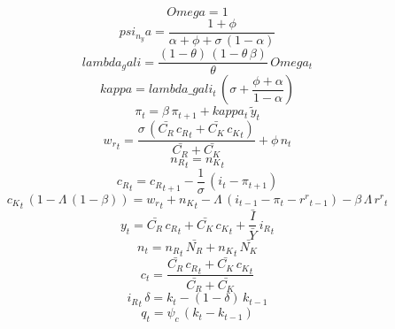 \documentclass[10pt,a4paper]{article}
\begin{document}
\footnotesize
\begin{dmath*}
Omega = 1
\end{dmath*}
\begin{dmath*}
psi_n_ya = \frac{1+{\phi}}{{\alpha}+{\phi}+{\sigma}\, \left(1-{\alpha}\right)}
\end{dmath*}
\begin{dmath*}
lambda_gali = \frac{\left(1-{\theta}\right)\, \left(1-{\theta}\, {\beta}\right)}{{\theta}}\, Omega_{t}
\end{dmath*}
\begin{dmath*}
kappa = lambda\_gali_{t}\, \left({\sigma}+\frac{{\phi}+{\alpha}}{1-{\alpha}}\right)
\end{dmath*}
\begin{dmath}
{\pi}_{t}={\beta}\, {\pi}_{t+1}+kappa_{t}\, {\tilde y}_{t}
\end{dmath}
\begin{dmath}
{w_r}_{t}=\frac{{\sigma}\, \left(\bar{C_R}\, {c_R}_{t}+\bar{C_K}\, {c_K}_{t}\right)}{\bar{C_R}+\bar{C_K}}+{\phi}\, {n}_{t}
\end{dmath}
\begin{dmath}
{n_R}_{t}={n_K}_{t}
\end{dmath}
\begin{dmath}
{c_R}_{t}={c_R}_{t+1}-\frac{1}{{\sigma}}\, \left({i}_{t}-{\pi}_{t+1}\right)
\end{dmath}
\begin{dmath}
{c_K}_{t}\, \left(1-{\Lambda}\, \left(1-{\beta}\right)\right)={w_r}_{t}+{n_K}_{t}-{\Lambda}\, \left({i}_{t-1}-{\pi}_{t}-{r^r}_{t-1}\right)-{\beta}\, {\Lambda}\, {r^r}_{t}
\end{dmath}
\begin{dmath}
{y}_{t}=\bar{C_R}\, {c_R}_{t}+\bar{C_K}\, {c_K}_{t}+{\frac{\bar{I}}{\bar{Y}}}\, {i_R}_{t}
\end{dmath}
\begin{dmath}
{n}_{t}={n_R}_{t}\, \bar{N_R}+{n_K}_{t}\, \bar{N_K}
\end{dmath}
\begin{dmath}
{c}_{t}=\frac{\bar{C_R}\, {c_R}_{t}+\bar{C_K}\, {c_K}_{t}}{\bar{C_R}+\bar{C_K}}
\end{dmath}
\begin{dmath}
{i_R}_{t}\, {\delta}={k}_{t}-\left(1-{\delta}\right)\, {k}_{t-1}
\end{dmath}
\begin{dmath}
{q}_{t}={\psi_c}\, \left({k}_{t}-{k}_{t-1}\right)
\end{dmath}
\end{document}
